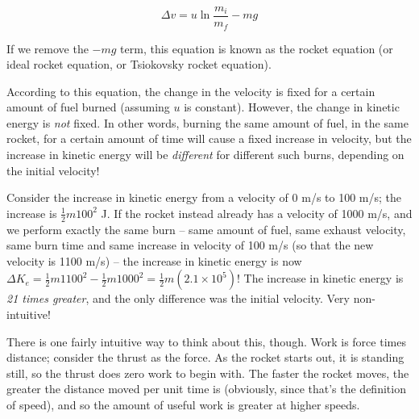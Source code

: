 \begin{equation}
\Delta v = u \ln \frac{m_i}{m_f} - m g
\end{equation}

If we remove the $- m g$ term, this equation is known as the rocket equation (or ideal rocket equation, or Tsiokovsky rocket equation).

According to this equation, the change in the velocity is fixed for a certain amount of fuel burned (assuming $u$ is constant). However, the change in kinetic energy is \emph{not} fixed. In other words, burning the same amount of fuel, in the same rocket, for a certain amount of time will cause a fixed increase in velocity, but the increase in kinetic energy will be \emph{different} for different such burns, depending on the initial velocity!

Consider the increase in kinetic energy from a velocity of 0 m/s to 100 m/s; the increase is $\frac{1}{2} m 100^2$ J. If the rocket instead already has a velocity of 1000 m/s, and we perform exactly the same burn -- same amount of fuel, same exhaust velocity, same burn time and same increase in velocity of 100 m/s (so that the new velocity is 1100 m/s) -- the increase in kinetic energy is now $\Delta K_e = \frac{1}{2} m 1100^2 - \frac{1}{2} m 1000^2 = \frac{1}{2} m (2.1 \times 10^5)$! The increase in kinetic energy is \emph{21 times greater}, and the only difference was the initial velocity. Very non-intuitive!

There is one fairly intuitive way to think about this, though. Work is force times distance; consider the thrust as the force. As the rocket starts out, it is standing still, so the thrust does zero work to begin with. The faster the rocket moves, the greater the distance moved per unit time is (obviously, since that's the definition of speed), and so the amount of useful work is greater at higher speeds.
